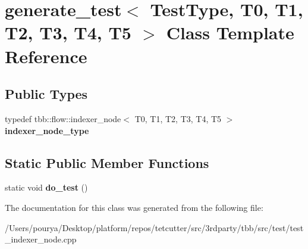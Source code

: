 \hypertarget{classgenerate__test_3_01TestType_00_01T0_00_01T1_00_01T2_00_01T3_00_01T4_00_01T5_01_4}{}\section{generate\+\_\+test$<$ Test\+Type, T0, T1, T2, T3, T4, T5 $>$ Class Template Reference}
\label{classgenerate__test_3_01TestType_00_01T0_00_01T1_00_01T2_00_01T3_00_01T4_00_01T5_01_4}
\subsection*{Public Types}
\begin{DoxyCompactItemize}
\item 
\hypertarget{classgenerate__test_3_01TestType_00_01T0_00_01T1_00_01T2_00_01T3_00_01T4_00_01T5_01_4_accf253c57c62e8a97843e6ac531563eb}{}typedef tbb\+::flow\+::indexer\+\_\+node$<$ T0, T1, T2, T3, T4, T5 $>$ {\bfseries indexer\+\_\+node\+\_\+type}\label{classgenerate__test_3_01TestType_00_01T0_00_01T1_00_01T2_00_01T3_00_01T4_00_01T5_01_4_accf253c57c62e8a97843e6ac531563eb}

\end{DoxyCompactItemize}
\subsection*{Static Public Member Functions}
\begin{DoxyCompactItemize}
\item 
\hypertarget{classgenerate__test_3_01TestType_00_01T0_00_01T1_00_01T2_00_01T3_00_01T4_00_01T5_01_4_a9b3c2291fa822493758b5c630a9a8ec0}{}static void {\bfseries do\+\_\+test} ()\label{classgenerate__test_3_01TestType_00_01T0_00_01T1_00_01T2_00_01T3_00_01T4_00_01T5_01_4_a9b3c2291fa822493758b5c630a9a8ec0}

\end{DoxyCompactItemize}


The documentation for this class was generated from the following file\+:\begin{DoxyCompactItemize}
\item 
/\+Users/pourya/\+Desktop/platform/repos/tetcutter/src/3rdparty/tbb/src/test/test\+\_\+indexer\+\_\+node.\+cpp\end{DoxyCompactItemize}
